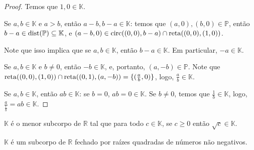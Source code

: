 \begin{proof}
    Temos que $1, 0 \in \mathbb K$.

    Se $a, b \in \mathbb K$ e $a>b$, então $a-b, b-a \in \mathbb K$: temos que $(a, 0), (b, 0) \in \mathbb P$, então $b-a \in \operatorname{dist}(\mathbb P)\subseteq \mathbb K$, e $(a-b, 0) \in \operatorname{circ}((0, 0), b-a)\cap \operatorname{reta}((0, 0), (1, 0))$.

    Note que isso implica que se $a, b \in \mathbb K$, então $b-a\in \mathbb K$. Em particular, $-a \in \mathbb K$.

    Se $a, b \in \mathbb K$ e $b\neq 0$, então $-b \in \mathbb K$, e, portanto, $(a, -b)\in \mathbb P$. Note que $\operatorname{reta}((0, 0), (1, 0))\cap \operatorname{reta}((0, 1), (a, -b))=\{(\frac ab, 0)\}$, logo, $\frac ab \in \mathbb K$.

    Se $a, b \in \mathbb K$, então $ab \in \mathbb K$: se $b=0$, $ab=0\in \mathbb K$. Se $b\neq 0$, temos que $\frac 1b\in \mathbb K$, logo, $\frac{a}{\frac1b}=ab\in \mathbb K$.
\end{proof}


\begin{prop}
    $\mathbb K$ é o menor subcorpo de $\mathbb R$ tal que para todo $c \in \mathbb K$, se $c\geq 0$ então $\sqrt c \in \mathbb K$.
\end{prop}
\begin{prop}
    $\mathbb K$ é um subcorpo de $\mathbb R$ fechado por raízes quadradas de números não negativos.
\end{prop}

